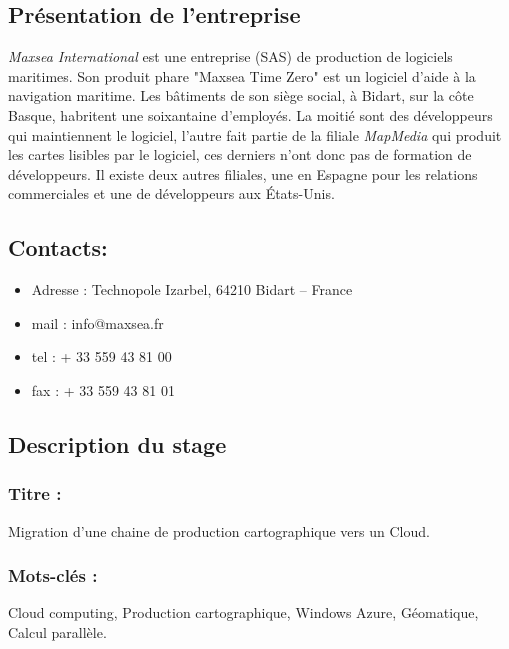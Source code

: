 
\subsection{Présentation de l'entreprise \maxsea}
\textit{Maxsea International} est une entreprise (SAS) de production
de logiciels maritimes. Son produit phare "Maxsea Time Zero" est un
logiciel d'aide à la navigation maritime. Les bâtiments de son siège
social, à Bidart, sur la côte Basque, habritent une soixantaine
d'employés. La moitié sont des développeurs qui maintiennent le
logiciel, l'autre fait partie de la filiale \textit{MapMedia} qui
produit les cartes lisibles par le logiciel, ces derniers n'ont donc
pas de formation de développeurs.  Il existe deux autres filiales, une
en Espagne pour les relations commerciales et une de développeurs aux
États-Unis.


\subsection{Contacts: \maxsea}

\begin{itemize}
\item Adresse : Technopole Izarbel, 64210 Bidart – France
\item mail : info@maxsea.fr
\item tel : + 33 559 43 81 00
\item fax : + 33 559 43 81 01
\end{itemize}


\subsection{Description du stage}

\subsubsection*{Titre :} 
{\centering Migration d'une chaine de production cartographique
  vers un Cloud. \\}

\subsubsection*{Mots-clés :}
{\centering Cloud computing, Production cartographique, Windows Azure,
  Géomatique, Calcul parallèle. \\}

